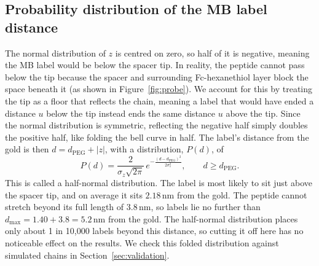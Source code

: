 \documentclass[10pt,a4paper]{article}
\numberwithin{equation}{section}
\newcommand{\nm}{\,\mathrm{nm}}
\newcommand{\dpeg}{d_{\mathrm{PEG}}}
\begin{document}
\subsection*{Probability distribution of the MB label distance}
The normal distribution of $z$ is centred on zero, so half of it is negative, meaning the MB label would be below the spacer tip. In reality, the peptide cannot pass below the tip because the spacer and surrounding Fc-hexanethiol layer block the space beneath it (as shown in Figure~\ref{fig:probe}). We account for this by treating the tip as a floor that reflects the chain, meaning a label that would have ended a distance $u$ below the tip instead ends the same distance $u$ above the tip. Since the normal distribution is symmetric, reflecting the negative half simply doubles the positive half, like folding the bell curve in half. The label's distance from the gold is then $d = \dpeg + |z|$, with a distribution, $P(d)$, of
\[
P(d) = \frac{2}{\sigma_z\sqrt{2\pi}}\,e^{-\frac{(d-\dpeg)^2}{2\sigma_z^2}}, \qquad d \ge \dpeg.
\]
This is called a half-normal distribution. The label is most likely to sit just above the spacer tip, and on average it sits $2.18\nm$ from the gold. The peptide cannot stretch beyond its full length of $3.8\nm$, so labels lie no further than $d_{\max} = 1.40 + 3.8 = 5.2\nm$ from the gold. The half-normal distribution places only about 1 in 10,000 labels beyond this distance, so cutting it off here has no noticeable effect on the results. We check this folded distribution against simulated chains in Section~\ref{sec:validation}.
\end{document}
